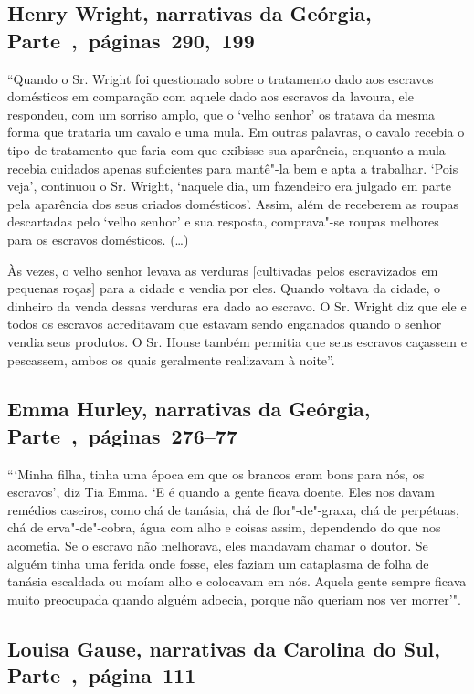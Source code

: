 \subsection{Henry Wright, narrativas da Geórgia, Parte~,~páginas~290,~199}
\label{ref319}

``Quando o Sr. Wright foi questionado sobre o tratamento dado aos
escravos domésticos em comparação com aquele dado aos escravos da
lavoura, ele respondeu, com um sorriso amplo, que o `velho senhor' os
tratava da mesma forma que trataria um cavalo e uma mula. Em outras
palavras, o cavalo recebia o tipo de tratamento que faria com que
exibisse sua aparência, enquanto a mula recebia cuidados apenas
suficientes para mantê"-la bem e apta a trabalhar. `Pois veja', continuou
o Sr. Wright, `naquele dia, um fazendeiro era julgado em parte pela
aparência dos seus criados domésticos'. Assim, além de receberem as
roupas descartadas pelo `velho senhor' e sua resposta, comprava"-se
roupas melhores para os escravos domésticos. (\ldots{})

Às vezes, o velho senhor levava as verduras {[}cultivadas pelos escravizados
em pequenas roças{]} para a cidade e vendia por eles. Quando voltava da
cidade, o dinheiro da venda dessas verduras era dado ao escravo. O Sr.
Wright diz que ele e todos os escravos acreditavam que estavam sendo
enganados quando o senhor vendia seus produtos. O Sr. House também
permitia que seus escravos caçassem e pescassem, ambos os quais
geralmente realizavam à noite''.

\subsection{Emma Hurley, narrativas da Geórgia, Parte~,~páginas~276--77}
\label{ref159}

```Minha filha, tinha uma época em que os brancos eram bons para nós, os
escravos', diz Tia Emma. `E é quando a gente ficava doente. Eles nos
davam remédios caseiros, como chá de tanásia, chá de flor"-de"-graxa, chá
de perpétuas, chá de erva"-de"-cobra, água com alho e coisas assim,
dependendo do que nos acometia. Se o escravo não melhorava, eles
mandavam chamar o doutor. Se alguém tinha uma ferida onde fosse, eles
faziam um cataplasma de folha de tanásia escaldada ou moíam alho e
colocavam em nós. Aquela gente sempre ficava muito preocupada quando
alguém adoecia, porque não queriam nos ver morrer'".

\subsection{Louisa Gause, narrativas da Carolina do Sul, Parte~,~página~111} 
\label{ref103}

